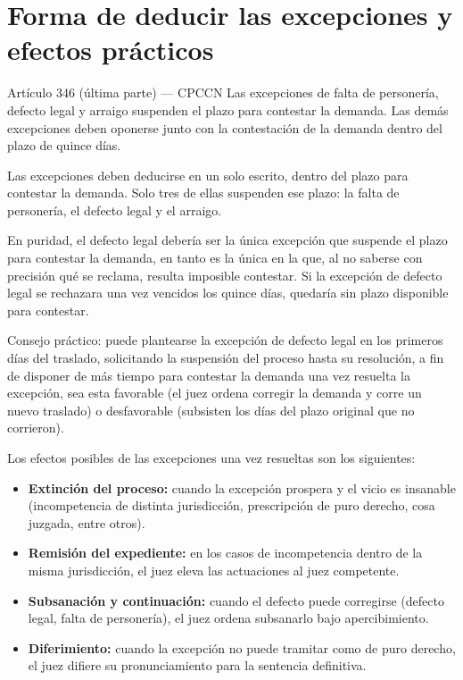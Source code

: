 \documentclass[12pt,oneside]{book}
\begin{document}
\section{Forma de deducir las excepciones y efectos prácticos}

\begin{definition}{Artículo 346 (última parte) --- CPCCN}
Las excepciones de falta de personería, defecto legal y arraigo suspenden el plazo para contestar la demanda. Las demás excepciones deben oponerse junto con la contestación de la demanda dentro del plazo de quince días.
\end{definition}

Las excepciones deben deducirse en un solo escrito, dentro del plazo para contestar la demanda. Solo tres de ellas suspenden ese plazo: la falta de personería, el defecto legal y el arraigo.

\begin{note}
En puridad, el defecto legal debería ser la única excepción que suspende el plazo para contestar la demanda, en tanto es la única en la que, al no saberse con precisión qué se reclama, resulta imposible contestar. Si la excepción de defecto legal se rechazara una vez vencidos los quince días, quedaría sin plazo disponible para contestar.

Consejo práctico: puede plantearse la excepción de defecto legal en los primeros días del traslado, solicitando la suspensión del proceso hasta su resolución, a fin de disponer de más tiempo para contestar la demanda una vez resuelta la excepción, sea esta favorable (el juez ordena corregir la demanda y corre un nuevo traslado) o desfavorable (subsisten los días del plazo original que no corrieron).
\end{note}

Los efectos posibles de las excepciones una vez resueltas son los siguientes:

\begin{itemize}
    \item \textbf{Extinción del proceso:} cuando la excepción prospera y el vicio es insanable (incompetencia de distinta jurisdicción, prescripción de puro derecho, cosa juzgada, entre otros).
    \item \textbf{Remisión del expediente:} en los casos de incompetencia dentro de la misma jurisdicción, el juez eleva las actuaciones al juez competente.
    \item \textbf{Subsanación y continuación:} cuando el defecto puede corregirse (defecto legal, falta de personería), el juez ordena subsanarlo bajo apercibimiento.
    \item \textbf{Diferimiento:} cuando la excepción no puede tramitar como de puro derecho, el juez difiere su pronunciamiento para la sentencia definitiva.
\end{itemize}
\end{document}
